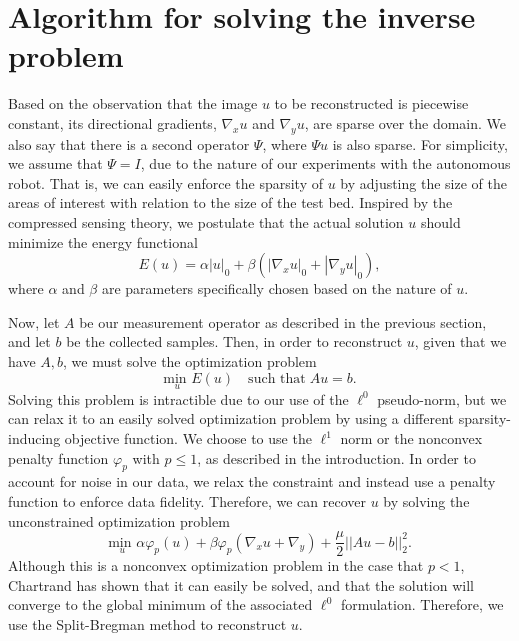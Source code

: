 \documentclass[english]{article}\usepackage[]{graphicx}\usepackage[]{color}
\begin{document}

\section{Algorithm for solving the inverse problem}

Based on the observation that the image $u$ to be reconstructed is
piecewise constant, its directional gradients, $\nabla_x u$ and $\nabla_y u$, are sparse over
the domain. We also say that there is a second operator $\Psi$, where $\Psi u$
is also sparse. For simplicity, we assume that $\Psi = I$, due to the nature 
of our experiments with the autonomous robot. That is, we can easily 
enforce the sparsity of $u$ by adjusting the size of the areas of interest with 
relation to the size of the test bed. Inspired by the compressed sensing theory, we postulate
that the actual solution $u$ should minimize the energy functional 
\[E(u) = \alpha |u|_0 + \beta\left(|\nabla_x u|_0+|\nabla_y u|_0\right),\]
where $\alpha$ and $\beta$ are parameters specifically chosen based on the nature
of $u$.

Now, let $A$ be our measurement operator as described in the previous section, and let 
$b$ be the collected samples. Then, in order to reconstruct $u$, given that we have $A, b$, we must solve the optimization problem
\[ \underset{u}{{\text{{min }}}} E(u)\quad\text{such that}\; Au=b.\]
Solving this problem is intractible due to our use of the $\ell^0$ pseudo-norm, but we 
can relax it to an easily solved optimization problem by using a different sparsity-inducing 
objective function. We choose to use the $\ell^1$ norm or the nonconvex penalty function
$\varphi_p$ with $p \leq 1$, as described in the introduction. In order to account for noise 
in our data, we relax the constraint and instead use a penalty function to enforce data 
fidelity. Therefore, we can recover $u$ by solving the unconstrained optimization problem 
\begin{equation}
\underset{u}{{\text{{min }}}}\alpha\varphi_p\left(u\right)+\beta\varphi_p\left(\nabla_x u + \nabla_y\right)+\frac{\mu}{2}||Au-b||_2^2.\label{eq:minprob}\end{equation}
Although this is a nonconvex optimization problem in the case that $p<1$,
Chartrand \cite{chartrand2009fast} has shown that it can easily be solved, 
and that the solution will converge to the global minimum of the 
associated $\ell^0$ formulation. Therefore, we use the Split-Bregman method to reconstruct $u$. 
\end{document}
